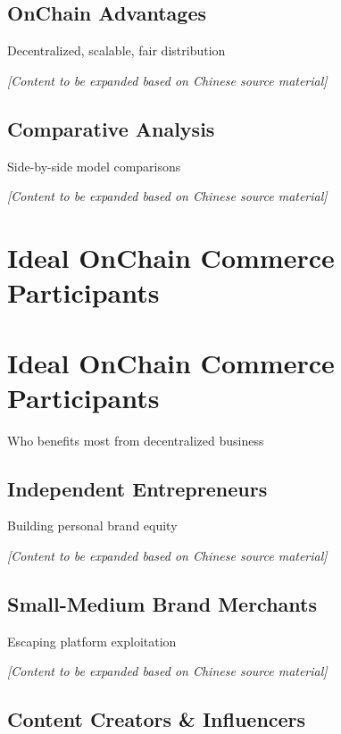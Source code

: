 \documentclass[
  Letterpaper,
]{scrbook}
\begin{document}
\section{OnChain Advantages}\label{onchain-advantages}

Decentralized, scalable, fair distribution

\emph{{[}Content to be expanded based on Chinese source material{]}}

\section{Comparative Analysis}\label{comparative-analysis}

Side-by-side model comparisons

\emph{{[}Content to be expanded based on Chinese source material{]}}

\chapter{Ideal OnChain Commerce
Participants}\label{ideal-onchain-commerce-participants}

\chapter{Ideal OnChain Commerce
Participants}\label{sec-ideal-participants}

Who benefits most from decentralized business

\section{Independent Entrepreneurs}\label{independent-entrepreneurs}

Building personal brand equity

\emph{{[}Content to be expanded based on Chinese source material{]}}

\section{Small-Medium Brand
Merchants}\label{small-medium-brand-merchants}

Escaping platform exploitation

\emph{{[}Content to be expanded based on Chinese source material{]}}

\section{Content Creators \&
Influencers}\label{content-creators-influencers}
\end{document}

